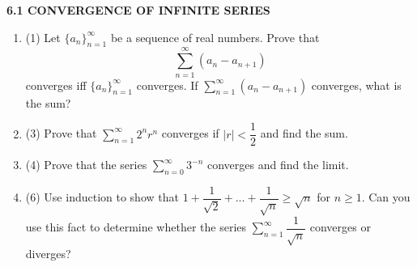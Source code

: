 \documentclass[fleqn]{article}
\begin{document}
  \textbf{6.1 CONVERGENCE OF INFINITE SERIES}
  \begin{enumerate}
    \item (1) Let $\{ a_n \}_{n=1}^{\infty}$ be a sequence of real numbers. Prove that
    $$\sum\limits_{n=1}^{\infty} (a_n-a_{n+1})$$
    converges iff $\{ a_n \}_{n=1}^{\infty}$ converges. If $\sum\limits_{n=1}^{\infty} (a_n-a_{n+1})$ converges, 
    what is the sum?


    \item (3) Prove that $\sum\limits_{n=1}^{\infty} 2^n r^n$ converges if $|r| < \dfrac{1}{2}$ and find the sum. 


    \item (4) Prove that the series $\sum\limits_{n=0}^{\infty} 3^{-n}$ converges and find the limit. 

    \item (6) Use induction to show that $1+\dfrac{1}{\sqrt{2}}+...+\dfrac{1}{\sqrt{n}} \geq \sqrt{n}$ for $n \geq 1$.
    Can you use this fact to determine whether the series $\sum\limits_{n=1}^{\infty} \dfrac{1}{\sqrt{n}}$ converges or diverges? 
 

  \end{enumerate}
\end{document}
